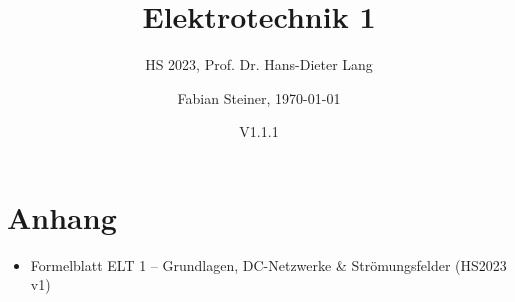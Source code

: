 \documentclass[fontsize=8pt, a4paper, fleqn, DIV=calc]{scrartcl}
\title{\vspace{-1cm}Elektrotechnik 1}
\subtitle{HS 2023, Prof. Dr. Hans-Dieter Lang}
\author{Fabian Steiner, \today}
\date{{\small V1.1.1}}
\begin{document}
    \begin{minipage}[c]{0.85\columnwidth}
            \maketitle
    \end{minipage}
    \begin{minipage}[c]{0.15\columnwidth}
        \begin{center}
            \quad
            \qquad    
        \end{center}
    \end{minipage}
    
    \thispagestyle{fancy}%
    
    
    
    
    
    \section{Anhang}
    \begin{itemize}
        \item Formelblatt ELT 1 – Grundlagen, DC-Netzwerke \& Strömungsfelder (HS2023 v1)
    \end{itemize}
\end{document}
